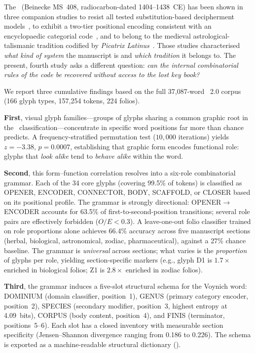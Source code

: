 
The \vms\ (Beinecke MS~408, radiocarbon-dated 1404--1438~CE) has been
shown in three companion studies to resist all tested substitution-based
decipherment models~\citep{jimenez2026negative}, to exhibit a two-tier
positional encoding consistent with an encyclopaedic categorial
code~\citep{jimenez2026twotier}, and to belong to the medieval
astrological-talismanic tradition codified by \textit{Picatrix
Latinus}~\citep{jimenez2026venusring}. Those studies characterised
\emph{what kind of system} the manuscript is and \emph{which tradition}
it belongs to. The present, fourth study asks a different question:
\emph{can the internal combinatorial rules of the code be recovered
without access to the lost key book?}

We report three cumulative findings based on the full 37,087-word
\sta\ 2.0 corpus (166 glyph types, 157,254 tokens, 224 folios).

\textbf{First}, visual glyph families---groups of glyphs sharing a
common graphic root in the \sta\ classification---concentrate in
specific word positions far more than chance predicts. A
frequency-stratified permutation test ($10{,}000$ iterations) yields
$z = -3.38$, $p = 0.0007$, establishing that graphic form encodes
functional role: glyphs that \emph{look alike} tend to \emph{behave
alike} within the word.

\textbf{Second}, this form--function correlation resolves into a
six-role combinatorial grammar. Each of the 34 core glyphs (covering
99.5\% of tokens) is classified as OPENER, ENCODER, CONNECTOR, BODY,
SCAFFOLD, or CLOSER based on its positional profile. The grammar is
strongly directional: OPENER$\to$ENCODER accounts for 63.5\% of
first-to-second-position transitions; several role pairs are effectively
forbidden ($O/E < 0.3$). A leave-one-out folio classifier trained on
role proportions alone achieves 66.4\% accuracy across five manuscript
sections (herbal, biological, astronomical, zodiac, pharmaceutical),
against a 27\% chance baseline. The grammar is \emph{universal} across
sections; what varies is the \emph{proportion} of glyphs per role,
yielding section-specific markers (e.g., glyph D1 is $1.7\times$
enriched in biological folios; Z1 is $2.8\times$ enriched in zodiac
folios).

\textbf{Third}, the grammar induces a five-slot structural schema for
the Voynich word: DOMINIUM (domain classifier, position~1),
GENUS (primary category encoder, position~2), SPECIES (secondary
modifier, position~3, highest entropy at 4.09~bits), CORPUS (body
content, position~4), and FINIS (terminator, positions~5--6). Each slot
has a closed inventory with measurable section specificity (Jensen--Shannon
divergence ranging from 0.186 to 0.226). The schema is exported as a
machine-readable structural dictionary
().

